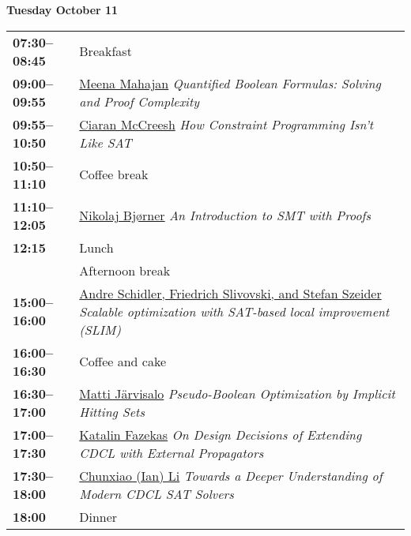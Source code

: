 \documentclass[11pt]{article}
\newcommand{\scheduletablewidth}{5.06in}
\begin{document}
\noindent\begin{minipage}{\textwidth}
\begin{center} {\bf\large Tuesday October 11} \end{center}
\begin{tabular}{ p{0.9in} p{\scheduletablewidth} }
{\bf 07:30--08:45}  & Breakfast \\


{\bf 09:00--09:55} & \hyperref[Mahajan]{Meena Mahajan}
{\em Quantified Boolean Formulas: Solving and Proof Complexity} \\

{\bf 09:55--10:50} & \hyperref[McCreesh]{Ciaran McCreesh}
{\em How Constraint Programming Isn't Like SAT} \\

{\bf 10:50--11:10} & Coffee break \\

{\bf 11:10--12:05} & \hyperref[Bjorner]{Nikolaj Bjørner}
{\em An Introduction to SMT with Proofs} \\

{\bf 12:15%
} & Lunch \\

 & Afternoon break \\

{\bf 15:00--16:00} & \hyperref[Schidler]{Andre Schidler, Friedrich Slivovski, and Stefan Szeider}
{\em Scalable optimization with SAT-based local improvement (SLIM)} \\

{\bf 16:00--16:30} & Coffee and cake \\

{\bf 16:30--17:00} & \hyperref[Jarvisalo]{Matti Järvisalo}
{\em Pseudo-Boolean Optimization by Implicit Hitting Sets} \\

{\bf 17:00--17:30} & \hyperref[Fazekas]{Katalin Fazekas}
{\em On Design Decisions of Extending CDCL with External Propagators} \\

{\bf 17:30--18:00} & \hyperref[Li]{Chunxiao (Ian) Li}
{\em Towards a Deeper Understanding of Modern CDCL SAT Solvers} \\

{\bf 18:00} & Dinner \\
\end{tabular}
\end{minipage}
\end{document}
